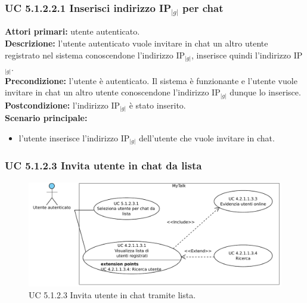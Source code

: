 \subsubsection{UC 5.1.2.2.1 Inserisci indirizzo IP$_{|g|}$ per chat}
\noindent
\textbf{Attori primari:} utente autenticato.\\
\textbf{Descrizione:} l'utente autenticato vuole invitare in chat un altro utente registrato nel sistema conoscendone l'indirizzo IP$_{|g|}$, inserisce quindi l'indirizzo IP$_{|g|}$.\\
\textbf{Precondizione:} l'utente è autenticato. Il sistema è funzionante e l'utente vuole invitare in chat un altro utente conoscendone l'indirizzo IP$_{|g|}$ dunque lo inserisce.\\
\textbf{Postcondizione:} l'indirizzo IP$_{|g|}$ è stato inserito.\\
\textbf{Scenario principale:}
\begin{itemize}
\item l'utente inserisce l'indirizzo IP$_{|g|}$ dell'utente che vuole invitare in chat.
\end{itemize}

\subsubsection{UC 5.1.2.3 Invita utente in chat da lista}

\begin{figure}[htbp]
\centering
\includegraphics[scale=0.7]{./casi_uso/UC5-1-2-3.pdf}
\caption{UC 5.1.2.3 Invita utente in chat tramite lista.}
\end{figure}

